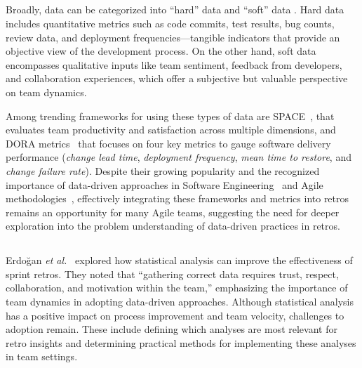 \subsection{}
\label{sec_background_data}

Broadly, data can be categorized into ``hard'' data and ``soft'' data \cite{derby_agile_2006,matthies_experience_2021}. Hard data includes quantitative metrics  such as code commits, test results, bug counts, review data, and deployment frequencies—tangible indicators that provide an objective view of the development process. On the other hand, soft data encompasses qualitative inputs like team sentiment, feedback from developers, and collaboration experiences, which offer a subjective but valuable perspective on team dynamics.

Among trending frameworks for using these types of data are SPACE~\cite{forsgren_space_2021}, that evaluates team productivity and satisfaction across multiple dimensions, and DORA metrics~\cite{google_2024_dora} that focuses on four key metrics to gauge software delivery performance (\textit{change lead time}, \textit{deployment frequency}, \textit{mean time to restore}, and \textit{change failure rate}). 
Despite their growing popularity and the recognized importance of data-driven approaches in Software Engineering~\cite{yalciner_data-driven_2024} and Agile methodologies~\cite{fawzy_exploring_2024, almeida_perceived_2023, biesialska_big_2021, ram_data-driven_2022, matthies_towards_2019}, effectively integrating these frameworks and metrics into retros remains an opportunity for many Agile teams, suggesting the need for deeper exploration into the problem understanding of data-driven practices in retros. 

\subsection{}
\label{sec_background_rw}

Erdoğan \textit{et al.}~\cite{erdogan_more_2018} explored how statistical analysis can improve the effectiveness of sprint retros. They noted that ``gathering correct data requires trust, respect, collaboration, and motivation within the team,'' emphasizing the importance of team dynamics in adopting data-driven approaches. Although statistical analysis has a positive impact on process improvement and team velocity, challenges to adoption remain. These include defining which analyses are most relevant for retro insights and determining practical methods for implementing these analyses in team settings.

